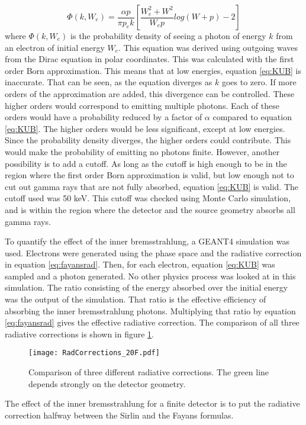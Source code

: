 \documentclass[../MaxHughesThesis.tex]{subfiles}
\begin{document}
\begin{equation}
	\Phi(k,W_{e}) = \frac{ \alpha p}{ \pi p_{e} k} [\frac{W_{e}^{2} + W^{2}}{W_{e}p}log(W + p) - 2]
	\label{eq:KUB}
\end{equation}
where $\Phi(k,W_{e})$ is the probability density of seeing a photon of energy $k$ from an electron of initial energy $W_{e}$.
This equation was derived using outgoing waves from the Dirac equation in polar coordinates.
This was calculated with the first order Born approximation.
This means that at low energies, equation \ref{eq:KUB} is inaccurate. 
That can be seen, as the equation diverges as $k$ goes to zero.
If more orders of the approximation are added, this divergence can be controlled.
These higher orders would correspond to emitting multiple photons.
Each of these orders would have a probability reduced by a factor of $\alpha$ compared to equation \ref{eq:KUB}.
The higher orders would be less significant, except at low energies. 
Since the probability density diverges, the higher orders could contribute.
This would make the probability of emitting no photons finite.	 		
However, another possibility is to add a cutoff. 
As long as the cutoff is high enough to be in the region where the first order Born approximation is valid, but low enough not to cut out gamma rays that are not fully absorbed, equation \ref{eq:KUB} is valid.
The cutoff used was 50 keV.
This cutoff was checked using Monte Carlo simulation, and is within the region where the detector and the source geometry absorbs all gamma rays.

To quantify the effect of the inner bremsstrahlung, a GEANT4 simulation was used.
Electrons were generated using the phase space and the radiative correction in equation \ref{eq:fayansrad}.
Then, for each electron, equation \ref{eq:KUB} was sampled and a photon generated.
No other physics process was looked at in this simulation.
The ratio consisting of the energy absorbed over the initial energy was the output of the simulation.
That ratio is the effective efficiency of absorbing the inner bremsstrahlung photons.
Multiplying that ratio by equation \ref{eq:fayansrad} gives the effective radiative correction.
The comparison of all three radiative corrections is shown in figure \ref{fig:rad}.

\begin{figure}[!htb]
	\centerline{\texttt{[image: RadCorrections\_20F.pdf]}}
	\caption{Comparison of three different radiative corrections.
		 The green line depends strongly on the detector geometry.
		 }
	\label{fig:rad}
\end{figure}
The effect of the inner bremsstrahlung for a finite detector is to put the radiative correction halfway between the Sirlin and the Fayans formulas.
\end{document}
